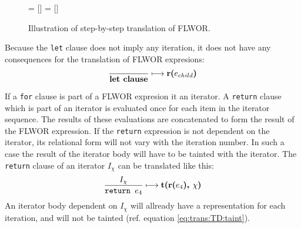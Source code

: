 \begin{figure}[h]
\centering
{}= []%
= [] %

\label{fig:trans:TD:flworExecute}
\caption[FLWOR translation order]{Illustration of step-by-step translation of FLWOR.}
\end{figure}

Because the \texttt{let} clause does not imply any iteration, it does not have any consequences for the
translation of FLWOR expresions:
\begin{equation}
\frac{}{\mbox{\textbf{let clause}}}\longmapsto \mbox{\textbf{r(}}e_{child}\mbox{\textbf{)}}
\label{rule:trans:TD:letclause}
\end{equation}

If a \texttt{for} clause is part of a FLWOR expresion it an iterator. A \texttt{return} clause which is part of an
iterator is evaluated once for each item in the iterator sequence. The results of these evaluations are
concatenated to form the result of the FLWOR expression. If the \texttt{return} expression is not dependent on the
iterator, its relational form will not vary with the iteration number. In such a case the result of the iterator
body will have to be tainted with the iterator. The \texttt{return} clause of an iterator $I_{\chi}$ can be
translated like this:
\begin{equation}
\frac{I_{\chi}}{\mbox{\texttt{return }}e_{4}}\longmapsto
\mbox{\textbf{t(r(}}e_{4}\mbox{\textbf{), }}\chi\mbox{\textbf{)}}
\label{rule:trans:TD:returnTaint}
\end{equation}
An iterator body dependent on $I_{\chi}$ will allready have a representation for each iteration, and will not be
tainted (ref. equation \ref{eq:trans:TD:taint}).

